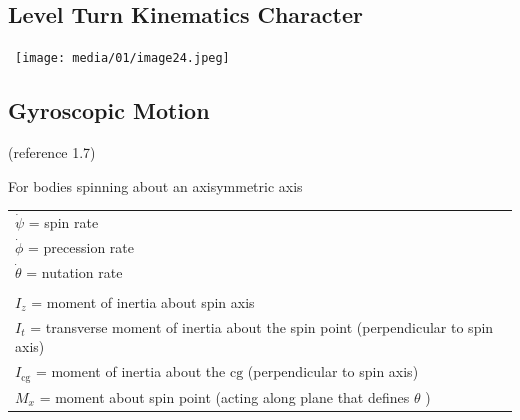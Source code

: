 \documentclass[
]{book}
\begin{document}
\hypertarget{level-turn-kinematics-character}{%
\subsection{Level Turn Kinematics Character}\label{level-turn-kinematics-character}}

~\texttt{[image: media/01/image24.jpeg]}

\hypertarget{gyroscopic-motion}{%
\subsection{Gyroscopic Motion}\label{gyroscopic-motion}}

(reference 1.7)

For bodies spinning about an axisymmetric axis

\begin{longtable}[]{@{}l@{}}
\toprule
\endhead
\begin{minipage}[t]{0.97\columnwidth}\raggedright
\(\dot{\psi}\) = spin rate\strut
\end{minipage}\tabularnewline
\begin{minipage}[t]{0.97\columnwidth}\raggedright
\(\dot{\phi}\) = precession rate\strut
\end{minipage}\tabularnewline
\begin{minipage}[t]{0.97\columnwidth}\raggedright
\(\dot{\theta}\) = nutation rate\strut
\end{minipage}\tabularnewline
\begin{minipage}[t]{0.97\columnwidth}\raggedright
\strut
\end{minipage}\tabularnewline
\begin{minipage}[t]{0.97\columnwidth}\raggedright
\(I_z\) = moment of inertia about spin axis\strut
\end{minipage}\tabularnewline
\begin{minipage}[t]{0.97\columnwidth}\raggedright
\(I_t\) = transverse moment of inertia about the spin point (perpendicular to spin axis)\strut
\end{minipage}\tabularnewline
\begin{minipage}[t]{0.97\columnwidth}\raggedright
\(I_{\mathrm{cg}}\) = moment of inertia about the \(\mathrm{cg}\) (perpendicular to spin axis)\strut
\end{minipage}\tabularnewline
\begin{minipage}[t]{0.97\columnwidth}\raggedright
\(M_x\) = moment about spin point (acting along plane that defines \(\theta\) )\strut
\end{minipage}\tabularnewline
\bottomrule
\end{longtable}
\end{document}
